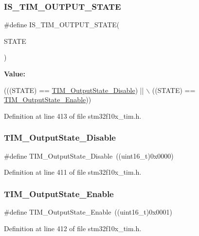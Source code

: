 \subsubsection{\texorpdfstring{I\+S\+\_\+\+T\+I\+M\+\_\+\+O\+U\+T\+P\+U\+T\+\_\+\+S\+T\+A\+TE}{IS\_TIM\_OUTPUT\_STATE}}
{\footnotesize\ttfamily \#define I\+S\+\_\+\+T\+I\+M\+\_\+\+O\+U\+T\+P\+U\+T\+\_\+\+S\+T\+A\+TE(\begin{DoxyParamCaption}\item[{}]{S\+T\+A\+TE }\end{DoxyParamCaption})}

{\bfseries Value\+:}
\begin{DoxyCode}
(((STATE) == \hyperlink{group___t_i_m___output___compare__state_ga4ad0f484cfa16b5190654da8278940d0}{TIM\_OutputState\_Disable}) || \(\backslash\)
                                    ((STATE) == \hyperlink{group___t_i_m___output___compare__state_ga65afdda8761b6ac5ed0c0ad67c05dffe}{TIM\_OutputState\_Enable}))
\end{DoxyCode}


Definition at line 413 of file stm32f10x\+\_\+tim.\+h.

\mbox{\label{group___t_i_m___output___compare__state_ga4ad0f484cfa16b5190654da8278940d0}} 
\subsubsection{\texorpdfstring{T\+I\+M\+\_\+\+Output\+State\+\_\+\+Disable}{TIM\_OutputState\_Disable}}
{\footnotesize\ttfamily \#define T\+I\+M\+\_\+\+Output\+State\+\_\+\+Disable~((uint16\+\_\+t)0x0000)}



Definition at line 411 of file stm32f10x\+\_\+tim.\+h.

\mbox{\label{group___t_i_m___output___compare__state_ga65afdda8761b6ac5ed0c0ad67c05dffe}} 
\subsubsection{\texorpdfstring{T\+I\+M\+\_\+\+Output\+State\+\_\+\+Enable}{TIM\_OutputState\_Enable}}
{\footnotesize\ttfamily \#define T\+I\+M\+\_\+\+Output\+State\+\_\+\+Enable~((uint16\+\_\+t)0x0001)}



Definition at line 412 of file stm32f10x\+\_\+tim.\+h.


